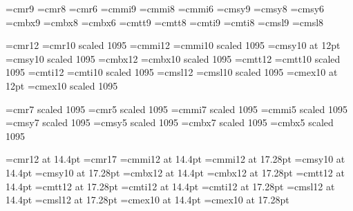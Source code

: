 
\font\ninerm=cmr9   \font\eightrm=cmr8   \font\sixrm=cmr6
\font\ninei=cmmi9   \font\eighti=cmmi8   \font\sixi=cmmi6
\font\ninesy=cmsy9  \font\eightsy=cmsy8  \font\sixsy=cmsy6
\font\ninebf=cmbx9  \font\eightbf=cmbx8  \font\sixbf=cmbx6
\font\ninett=cmtt9  \font\eighttt=cmtt8
\font\nineit=cmti9  \font\eightit=cmti8
\font\ninesl=cmsl9  \font\eightsl=cmsl8

\font\twlrm=cmr12           \font\elvrm=cmr10 scaled 1095
\font\twli=cmmi12           \font\elvi=cmmi10 scaled 1095
\font\twlsy=cmsy10 at 12pt  \font\elvsy=cmsy10 scaled 1095
\font\twlbf=cmbx12          \font\elvbf=cmbx10 scaled 1095
\font\twltt=cmtt12          \font\elvtt=cmtt10 scaled 1095
\font\twlit=cmti12          \font\elvit=cmti10 scaled 1095
\font\twlsl=cmsl12          \font\elvsl=cmsl10 scaled 1095
\font\twlex=cmex10 at 12pt  \font\elvex=cmex10 scaled 1095

\font\sevenhrm=cmr7 scaled 1095   \font\fivehrm=cmr5 scaled 1095
\font\sevenhi=cmmi7 scaled 1095   \font\fivehi=cmmi5 scaled 1095
\font\sevenhsy=cmsy7 scaled 1095  \font\fivehsy=cmsy5 scaled 1095
\font\sevenhbf=cmbx7 scaled 1095  \font\fivehbf=cmbx5 scaled 1095

\font\ftnrm=cmr12 at 14.4pt  \font\stnrm=cmr17
\font\ftni=cmmi12 at 14.4pt  \font\stni=cmmi12 at 17.28pt
\font\ftnsy=cmsy10 at 14.4pt \font\stnsy=cmsy10 at 17.28pt
\font\ftnbf=cmbx12 at 14.4pt \font\stnbf=cmbx12 at 17.28pt
\font\ftntt=cmtt12 at 14.4pt \font\stntt=cmtt12 at 17.28pt
\font\ftnit=cmti12 at 14.4pt \font\stnit=cmti12 at 17.28pt
\font\ftnsl=cmsl12 at 14.4pt \font\stnsl=cmsl12 at 17.28pt
\font\ftnex=cmex10 at 14.4pt \font\stnex=cmex10 at 17.28pt


